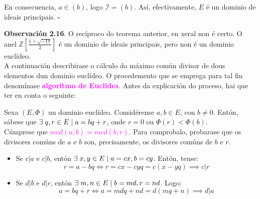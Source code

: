 \documentclass[twoside]{report}
\newcommand{\magbf}[1]{\textcolor{magenta}{\textbf{#1}}} %
\theoremstyle{mystyle}
\begin{document}
\noindent En consecuencia, $a \in (b)$, logo $\mathcal{I} = (b)$. Así, efectivamente, $E$ é un dominio de ideais principais. $\square$

\vspace{3mm}

\noindent \textbf{Observación 2.16}. O recíproco do teorema anterior, en xeral non é certo. O anel $\mathbb{Z}[\frac{1 + \sqrt{-19}}{2}]$ é un dominio de ideais principais, pero non é un dominio euclídeo.\\

\noindent A continuación describirase o cálculo do máximo común divisor de dous elementos dun dominio euclídeo. O procedemento que se emprega para tal fin denomínase \magbf{algoritmo de Euclides}. Antes da explicación do proceso, hai que ter en conta o seguinte:\\

\begin{mdframed}[linecolor = magenta]

\noindent Sexa $(E, \Phi)$ un dominio euclídeo. Considérense $a,b \in E$, con $b \neq 0$. Entón, sábese que $\exists \hspace{1mm} q,r \in E \hspace{1mm} | \hspace{1mm} a = bq + r$, onde $r = 0$ ou $\Phi(r) < \Phi(b)$. \\

\noindent Cúmprese que \magbf{$mcd(a,b) = mcd(b,r)$}. Para comprobalo, probarase que os divisores comúns de $a$ e $b$ son, precisamente, os divisores comúns de $b$ e $r$.

\begin{itemize}
    \item Se $c|a$ e $c|b$, entón $\exists \hspace{1mm} x,y \in E \hspace{1mm} | \hspace{1mm} a = cx, b = cy$. Entón, tense:
    $$r = a - bq \Longleftrightarrow r = cx - cyq = c(x - yq) \implies c|r$$
    
    \item Se $d|b$ e $d|r$, entón $\exists \hspace{1mm} m,n \in E \hspace{1mm} | \hspace{1mm} b = md, r = nd$. Logo:
    $$a = bq + r \Longleftrightarrow a = mdq + nd = d(mq + n) \implies d|a$$
\end{itemize}

\end{mdframed}
\end{document}
